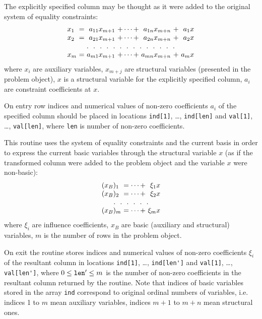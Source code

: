 The explicitly specified column may be thought as it were added to
the original system of equality constraints:
$$
\begin{array}{l@{\ }c@{\ }r@{\ }c@{\ }r@{\ }c@{\ }r}
x_1&=&a_{11}x_{m+1}&+\dots+&a_{1n}x_{m+n}&+&a_1x \\
x_2&=&a_{21}x_{m+1}&+\dots+&a_{2n}x_{m+n}&+&a_2x \\
\multicolumn{7}{c}
{.\ \ .\ \ .\ \ .\ \ .\ \ .\ \ .\ \ .\ \ .\ \ .\ \ .\ \ .\ \ .\ \ .}\\
x_m&=&a_{m1}x_{m+1}&+\dots+&a_{mn}x_{m+n}&+&a_mx \\
\end{array}
$$
where $x_i$ are auxiliary variables, $x_{m+j}$ are structural variables
(presented in the problem object), $x$ is a structural variable for the
explicitly specified column, $a_i$ are constraint coefficients at $x$.

On entry row indices and numerical values of non-zero coefficients
$a_i$ of the specified column should be placed in locations
\verb|ind[1]|, \dots, \verb|ind[len]| and \verb|val[1]|, \dots,
\verb|val[len]|, where \verb|len| is number of non-zero coefficients.

This routine uses the system of equality constraints and the current
basis in order to express the current basic variables through the
structural variable $x$ (as if the transformed column were added to the
problem object and the variable $x$ were non-basic):
$$
\begin{array}{l@{\ }c@{\ }r}
(x_B)_1&=\dots+&\xi_{1}x\\
(x_B)_2&=\dots+&\xi_{2}x\\
\multicolumn{3}{c}{.\ \ .\ \ .\ \ .\ \ .\ \ .}\\
(x_B)_m&=\dots+&\xi_{m}x\\
\end{array}
$$
where $\xi_i$ are influence coefficients, $x_B$ are basic (auxiliary
and structural) variables, $m$ is the number of rows in the problem
object.

On exit the routine stores indices and numerical values of non-zero
coefficients $\xi_i$ of the resultant column in locations \verb|ind[1]|,
\dots, \verb|ind[len']| and \verb|val[1]|, \dots, \verb|val[len']|,
where $0\leq{\tt len'}\leq m$ is the number of non-zero coefficients in
the resultant column returned by the routine. Note that indices of basic
variables stored in the array \verb|ind| correspond to original ordinal
numbers of variables, i.e. indices 1 to $m$ mean auxiliary variables,
indices $m+1$ to $m+n$ mean structural ones.

